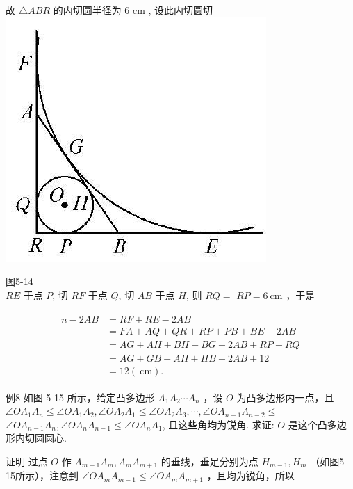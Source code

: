 \documentclass[10pt]{article}
\begin{document}
故 $\triangle A B R$ 的内切圆半径为 6 cm , 设此内切圆切\\
\includegraphics[max width=\textwidth, center]{2024_10_30_66b8e5e701da2093c133g-039(1)}

图5-14\\
$R E$ 于点 $P$, 切 $R F$ 于点 $Q$, 切 $A B$ 于点 $H$, 则 $R Q=$ $R P=6 \mathrm{~cm}$ ，于是

\begin{align*}
\begin{aligned}
n-2 A B & =R F+R E-2 A B \\
& =F A+A Q+Q R+R P+P B+B E-2 A B \\
& =A G+A H+B H+B G-2 A B+R P+R Q \\
& =A G+G B+A H+H B-2 A B+12 \\
& =12(\mathrm{~cm}) .
\end{aligned}
\end{align*}

例8 如图 5-15 所示，给定凸多边形 $A_{1} A_{2} \cdots A_{n}$ ，设 $O$ 为凸多边形内一点，且 $\angle O A_{1} A_{n} \leqslant \angle O A_{1} A_{2}, \angle O A_{2} A_{1} \leqslant \angle O A_{2} A_{3}, \cdots, \angle O A_{n-1} A_{n-2} \leqslant$ $\angle O A_{n-1} A_{n}, \angle O A_{n} A_{n-1} \leqslant \angle O A_{n} A_{1}$, 且这些角均为锐角. 求证: $O$ 是这个凸多边形内切圆圆心.

证明 过点 $O$ 作 $A_{m-1} A_{m}, A_{m} A_{m+1}$ 的垂线，垂足分别为点 $H_{m-1}, H_{m}$ （如图5-15所示），注意到 $\angle O A_{m} A_{m-1} \leqslant \angle O A_{m} A_{m+1}$ ，且均为锐角，所以
\end{document}
